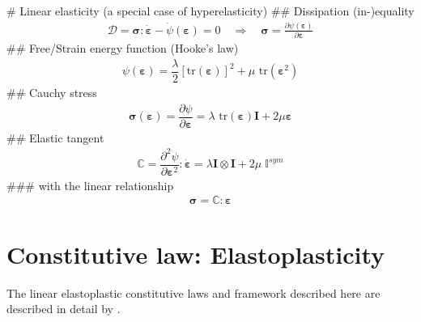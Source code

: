 \documentclass[]{scrartcl}
\begin{document}
\begin{easylist}[itemize]
# Linear elasticity (a special case of hyperelasticity)
## Dissipation (in-)equality
\begin{gather}
\mathcal{D} 
  = \boldsymbol{\sigma} : \dot{\boldsymbol{\varepsilon}} - \dot\psi \left( \boldsymbol{\varepsilon} \right) 
  = 0
\quad \Rightarrow \quad
\boldsymbol{\sigma} 
  = \frac{\partial \psi \left( \boldsymbol{\varepsilon} \right)}{\partial \boldsymbol{\varepsilon}}
\end{gather}
## Free/Strain energy function (Hooke's law)
\begin{gather}
\psi(\boldsymbol{\varepsilon})
  = \dfrac{\lambda}{2} \left[\textrm{tr}(\boldsymbol{\varepsilon})\right]^2 
  + \mu \textrm{ tr}(\boldsymbol{\varepsilon}^2)
\end{gather}
## Cauchy stress
\begin{gather}
\boldsymbol{\sigma}(\boldsymbol{\varepsilon}) =  \dfrac{\partial \psi}{\partial \boldsymbol{\varepsilon}} = \lambda \textrm{ tr}(\boldsymbol{\varepsilon}) \mathbf{I} + 2\mu\boldsymbol{\varepsilon}
\end{gather}
## Elastic tangent
\begin{gather}
\mathbb{C} = \dfrac{{\partial}^2 \psi}{\partial \boldsymbol{\varepsilon}^2}: \dot{\boldsymbol{\varepsilon}} = \lambda \mathbf{I} \otimes \mathbf{I} + 2\mu\;\mathbb{I}^{sym}
\end{gather}
### with the linear relationship
\begin{gather}
\boldsymbol{\sigma}
  = \boldsymbol{\mathbb{C}} : \boldsymbol{\varepsilon}
\end{gather}
\end{easylist}

\clearpage
\section{Constitutive law: Elastoplasticity}

The linear elastoplastic constitutive laws and framework described here are described in detail by \citep{Simo2006a,Mergheim2018a}.
\end{document}
